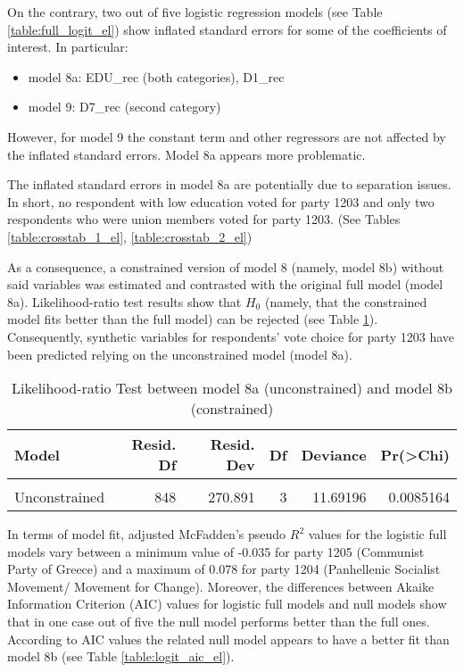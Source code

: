 \documentclass[
]{article}
\providecommand{\tightlist}{%
  \setlength{\itemsep}{0pt}\setlength{\parskip}{0pt}}
\begin{document}
On the contrary, two out of five logistic regression models (see Table \ref{table:full_logit_el}) show
inflated standard errors for some of the coefficients of interest. In particular:

\begin{itemize}
\tightlist
\item
  model 8a: EDU\_rec (both categories), D1\_rec
\item
  model 9: D7\_rec (second category)
\end{itemize}

However, for model 9 the constant term and other regressors are not affected by the inflated standard errors. Model 8a appears more problematic.

The inflated standard errors in model 8a are potentially due to separation issues. In short, no respondent with low education voted for party 1203 and only two respondents who were union members voted for party 1203. (See Tables \ref{table:crosstab_1_el}, \ref{table:crosstab_2_el})

As a consequence, a constrained version of model 8 (namely, model 8b) without said variables was
estimated and contrasted with the original full model (model 8a). Likelihood-ratio test results show
that \(H_0\) (namely, that the constrained model fits better than the full model) can be rejected
(see Table \ref{table:lrtest_1_el}). Consequently, synthetic variables for respondents' vote choice for
party 1203 have been predicted relying on the unconstrained model (model 8a).

\begin{table}[!h]

\caption{\label{tab:unnamed-chunk-79}Likelihood-ratio Test between model 8a (unconstrained) and model 8b (constrained)
                  \label{table:lrtest_1_el}}
\centering
\begin{tabular}[t]{l|r|r|r|r|r}
\hline
Model & Resid. Df & Resid. Dev & Df & Deviance & Pr(>Chi)\\
\hline
\cellcolor{gray!6}{Constrained} & \cellcolor{gray!6}{851} & \cellcolor{gray!6}{282.583} & \cellcolor{gray!6}{} & \cellcolor{gray!6}{} & \cellcolor{gray!6}{}\\
\hline
Unconstrained & 848 & 270.891 & 3 & 11.69196 & 0.0085164\\
\hline
\end{tabular}
\end{table}

In terms of model fit, adjusted McFadden's pseudo \(R^2\) values for the logistic full models vary between
a minimum value of
-0.035
for party 1205
(Communist Party of Greece)
and a maximum of
0.078
for party 1204
(Panhellenic Socialist Movement/ Movement for Change).
Moreover, the differences between Akaike Information Criterion (AIC) values for logistic full models and
null models show that in one case out of five the null model performs better than the full ones. According to AIC
values the related null model appears to have a better fit than model 8b (see Table \ref{table:logit_aic_el}).
\end{document}
